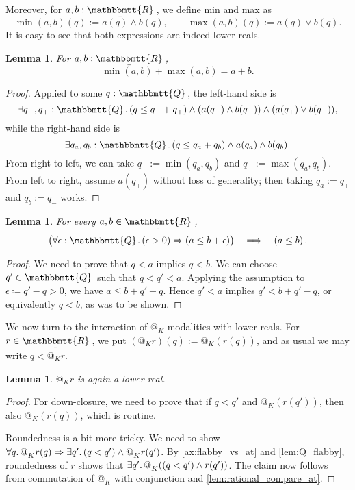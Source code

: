 \documentclass[11pt, oneside, article]{memoir}
\makeatletter
\theoremstyle{plain}
\newtheorem{lemma}[theorem]{Lemma}
\theoremstyle{definition}
\theoremstyle{remark}
\newcommand{\ubar}[1]{\underaccent{\bar}{#1}}
\newcommand{\internal}[1]{\raisebox{-.03ex}{$\mathbbmtt{#1}$}}
\newcommand{\hs}{\hspace{1.1pt}}
\newcommand{\tQQ}{\internal{Q}\hs}
\newcommand{\tRR}{\internal{R}\hs}
\newcommand{\tLR}{\ubar{\tRR}\hs}
\newcommand{\AtSymbol}{{@}}
\newcommand{\At}[2][]{\AtSymbol^{#1}_{#2}}
\newcommand{\imp}{\Rightarrow}
\makeatother
\begin{document}
Moreover, for $a,b : \tLR$, we define min and max as
\[
	\min(a,b)(q) := a(q) \land b(q),\qquad	\max(a,b)(q) := a(q) \lor b(q).
\]
It is easy to see that both expressions are indeed lower reals.

\begin{lemma}
	\label{lem.max_min_LR}
	For $a,b : \tLR$,
	\[
		\min(a,b) + \max(a,b) = a + b.
	\]
\end{lemma}

\begin{proof}
	Applied to some $q : \tQQ$, the left-hand side is 	
	\[
			\exists q_-, q_+  : \tQQ \ldotp (q \leq q_- + q_+) \land (a(q_-) \land b(q_-)) \land (a(q_+) \lor b(q_+)),
	\]
	while the right-hand side is
	\[
			\exists q_a, q_b  : \tQQ \ldotp (q \leq q_a + q_b) \land a(q_a) \land b(q_b).
	\]
	From right to left, we can take $q_- := \min(q_a,q_b)$ and $q_+ := \max(q_a,q_b)$. From left to right, assume $a(q_+)$ without loss of generality; then taking $q_a := q_+$ and $q_b := q_-$ works.
\end{proof}

\begin{lemma}
	\label{lem:eps_order}
	For every $a,b\in\tLR$,
	\[
		\big(\forall \epsilon : \tQQ\ldotp (\epsilon > 0) \imp (a \leq b + \epsilon)\big) \quad \Longrightarrow \quad \left( a \leq b \right).
	\]
\end{lemma}

\begin{proof}
	We need to prove that $q < a$ implies $q < b$. We can choose $q' \in \tQQ$ such that $q < q' < a$. Applying the assumption to $\epsilon\coloneqq q' - q > 0$, we have $a \le b + q' - q$. Hence $q' < a$ implies $q' < b + q' - q$, or equivalently $q < b$, as was to be shown.
\end{proof}

We now turn to the interaction of $\At{K}$-modalities with lower reals. For $r\in\tLR$, we put $(\At{K}r)(q) := \At{K}(r(q))$, and as usual we may write $q<\At{K}r$.

\begin{lemma}
	$\At{K}r$ is again a lower real.	
\end{lemma}

\begin{proof}
	For down-closure, we need to prove that if $q < q'$ and $\At{K}(r(q'))$, then also $\At{K}(r(q))$, which is routine.

	Roundedness is a bit more tricky. We need to show $\forall q\ldotp \At{K} r(q) \imp \exists q'\ldotp (q < q') \land \At{K} r(q')$. By \cref{ax:flabby_vs_at} and \cref{lem:Q_flabby}, roundedness of $r$ shows that $\exists q'\ldotp \At{K}((q < q') \land r(q'))$. The claim now follows from commutation of $\At{K}$ with conjunction and \cref{lem:rational_compare_at}.
\end{proof}
\end{document}

